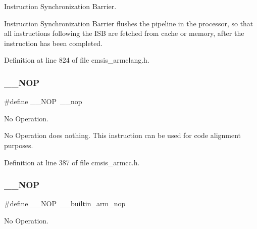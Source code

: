 Instruction Synchronization Barrier. 

Instruction Synchronization Barrier flushes the pipeline in the processor, so that all instructions following the I\+SB are fetched from cache or memory, after the instruction has been completed. 

Definition at line 824 of file cmsis\+\_\+armclang.\+h.

\mbox{\label{group___c_m_s_i_s___core___instruction_interface_gabd585ddc865fb9b7f2493af1eee1a572}} 
\subsubsection{\texorpdfstring{\+\_\+\+\_\+\+N\+OP}{\_\_NOP}\hspace{0.1cm}{\footnotesize\ttfamily [1/3]}}
{\footnotesize\ttfamily \#define \+\_\+\+\_\+\+N\+OP~\+\_\+\+\_\+nop}



No Operation. 

No Operation does nothing. This instruction can be used for code alignment purposes. 

Definition at line 387 of file cmsis\+\_\+armcc.\+h.

\mbox{\label{group___c_m_s_i_s___core___instruction_interface_gabd585ddc865fb9b7f2493af1eee1a572}} 
\subsubsection{\texorpdfstring{\+\_\+\+\_\+\+N\+OP}{\_\_NOP}\hspace{0.1cm}{\footnotesize\ttfamily [2/3]}}
{\footnotesize\ttfamily \#define \+\_\+\+\_\+\+N\+OP~\+\_\+\+\_\+builtin\+\_\+arm\+\_\+nop}



No Operation. 

